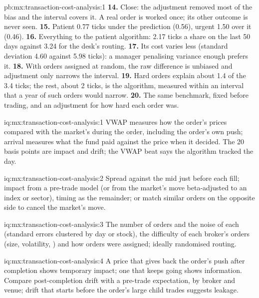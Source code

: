 \begin{solution}{pb:mx:transaction-cost-analysis:1}
\textbf{14.} Close: the adjustment removed most of the bias and the interval covers it. A real order is worked once; its other outcome is never seen.
\textbf{15.} Patient 0.77 ticks under the prediction (0.56), urgent 1.50 over it (0.46).
\textbf{16.} Everything to the patient algorithm: 2.17 ticks a share on the last 50 days against 3.24 for the desk's routing.
\textbf{17.} Its cost varies less (standard deviation 4.60 against 5.98 ticks): a manager penalising variance enough prefers it.
\textbf{18.} With orders assigned at random, the raw difference is unbiased and adjustment only narrows the interval.
\textbf{19.} Hard orders explain about 1.4 of the 3.4 ticks; the rest, about 2 ticks, is the algorithm, measured within an interval that a year of
such orders would narrow.
\textbf{20.} The same benchmark, fixed before trading, and an adjustment for how hard each order was.
\end{solution}

\begin{solution}{iq:mx:transaction-cost-analysis:1}
VWAP measures how the order's prices compared with the market's during the order, including the order's own push; arrival measures what the fund paid
against the price when it decided. The 20 basis points are impact and drift; the VWAP beat says the algorithm tracked the day.
\end{solution}

\begin{solution}{iq:mx:transaction-cost-analysis:2}
Spread against the mid just before each fill; impact from a pre-trade model (or from the market's move beta-adjusted to an index or sector), timing as
the remainder; or match similar orders on the opposite side to cancel the market's move.
\end{solution}

\begin{solution}{iq:mx:transaction-cost-analysis:3}
The number of orders and the noise of each (standard errors clustered by day or stock), the difficulty of each broker's orders (size, volatility,
) and how orders were assigned; ideally randomised routing.
\end{solution}

\begin{solution}{iq:mx:transaction-cost-analysis:4}
A price that gives back the order's push after completion shows temporary impact; one that keeps going shows information. Compare post-completion
drift with a pre-trade expectation, by broker and venue; drift that starts before the order's large child trades suggests leakage.
\end{solution}

